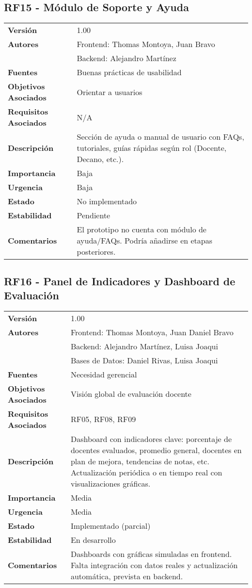 \documentclass{article}
\begin{document}
\subsection*{RF15 - Módulo de Soporte y Ayuda}
\begin{longtable}{>{\bfseries}l p{}}
Versión & 1.00 \\
Autores & Frontend: Thomas Montoya, Juan Bravo \\ 
        & Backend: Alejandro Martínez \\
Fuentes & Buenas prácticas de usabilidad \\
Objetivos Asociados & Orientar a usuarios \\
Requisitos Asociados & N/A \\
Descripción & Sección de ayuda o manual de usuario con FAQs, tutoriales, guías rápidas según rol (Docente, Decano, etc.). \\
Importancia & Baja \\
Urgencia & Baja \\
Estado & No implementado \\
Estabilidad & Pendiente \\
Comentarios & El prototipo no cuenta con módulo de ayuda/FAQs. Podría añadirse en etapas posteriores. \\
\end{longtable}

\subsection*{RF16 - Panel de Indicadores y Dashboard de Evaluación}
\begin{longtable}{>{\bfseries}l p{}}
Versión & 1.00 \\
Autores & Frontend: Thomas Montoya, Juan Daniel Bravo \\ 
        & Backend: Alejandro Martínez, Luisa Joaqui \\ 
        & Bases de Datos: Daniel Rivas, Luisa Joaqui \\
Fuentes & Necesidad gerencial \\
Objetivos Asociados & Visión global de evaluación docente \\
Requisitos Asociados & RF05, RF08, RF09 \\
Descripción & Dashboard con indicadores clave: porcentaje de docentes evaluados, promedio general, docentes en plan de mejora, tendencias de notas, etc. Actualización periódica o en tiempo real con visualizaciones gráficas. \\
Importancia & Media \\
Urgencia & Media \\
Estado & Implementado (parcial) \\
Estabilidad & En desarrollo \\
Comentarios & Dashboards con gráficas simuladas en frontend. Falta integración con datos reales y actualización automática, prevista en backend. \\
\end{longtable}
\end{document}
